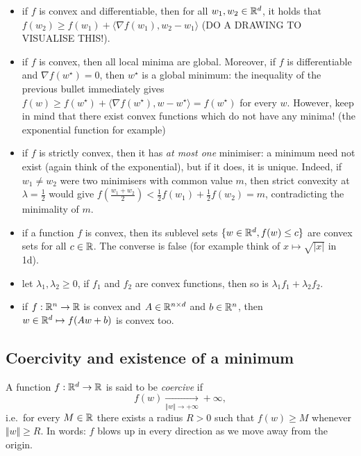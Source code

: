 \begin{itemize}
    \item if $f$ is convex and differentiable, then for all $w_1, w_2 \in \mathbb{R}^d$, it holds that $f(w_2) \geq f(w_1) + \langle \nabla f(w_1), w_2 - w_1 \rangle$ (DO A DRAWING TO VISUALISE THIS!).
    \item if $f$ is convex, then all local minima are global. Moreover, if $f$ is differentiable and $\nabla f(w^\star) = 0$, then $w^\star$ is a global minimum: the inequality of the previous bullet immediately gives $f(w) \geq f(w^\star) + \langle \nabla f(w^\star), w - w^\star\rangle = f(w^\star)$ for every $w$. However, keep in mind that there exist convex functions which do not have any minima! (the exponential function for example)
    \item if $f$ is strictly convex, then it has \emph{at most one} minimiser: a minimum need not exist (again think of the exponential), but if it does, it is unique. Indeed, if $w_1 \neq w_2$ were two minimisers with common value $m$, then strict convexity at $\lambda = \tfrac12$ would give $f(\tfrac{w_1 + w_2}{2}) < \tfrac12 f(w_1) + \tfrac12 f(w_2) = m$, contradicting the minimality of $m$.
    \item if a function $f$ is convex, then its sublevel sets $\{ w \in \mathbb{R}^d, f(w) \leq c \}$ are convex sets for all $c \in \mathbb{R}$. The converse is false (for example think of $x \mapsto \sqrt{|x|}$ in 1d).
    \item let $\lambda_1, \lambda_2 \geq 0$, if $f_1$ and $f_2$ are convex functions, then so is $\lambda_1 f_1 + \lambda_2 f_2$.
    \item if $f : \mathbb{R}^n \to \mathbb{R}$ is convex and $A \in \mathbb{R}^{n \times d}$ and $b \in \mathbb{R}^n$, then $w \in \mathbb{R}^d \mapsto f(A w + b)$ is convex too.
\end{itemize}

\subsection{Coercivity and existence of a minimum}
\label{subsec:coercive}

\begin{definition}
A function $f : \mathbb{R}^d \to \mathbb{R}$ is said to be \emph{coercive} if
\[
f(w) \xrightarrow[\Vert w \Vert \to +\infty]{} +\infty ,
\]
i.e.\ for every $M \in \mathbb{R}$ there exists a radius $R > 0$ such that $f(w) \geq M$ whenever $\Vert w \Vert \geq R$. In words: $f$ blows up in every direction as we move away from the origin.
\end{definition}


